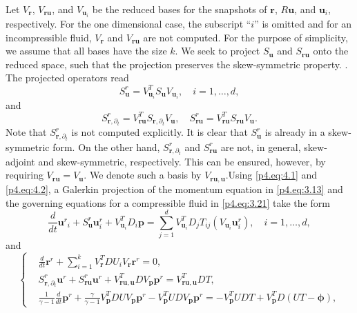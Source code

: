 Let $V_{\mathbf r}$, $V_{\mathbf r \mathbf u}$, and $V_{\mathbf u_i}$ be the reduced bases for the snapshots of $\mathbf r$, $R \mathbf u$, and $\mathbf u_i$, respectively. For the one dimensional case, the subscript ``$i$'' is omitted and for an incompressible fluid, $V_{ \mathbf r}$ and $V_{\mathbf r \mathbf u}$ are not computed. For the purpose of simplicity, we assume that all bases have the size $k$. We seek to project $S_{\mathbf u}$ and $S_{\mathbf r \mathbf u}$ onto the reduced space, such that the projection preserves the skew-symmetric property. . The projected operators read
\begin{equation} \label{p4.eq:4.1}
	S^r _{\mathbf u} = V_{ \mathbf u_i}^T S _{\mathbf u} V_{ \mathbf u_i}, \quad i=1,\dots,d,
\end{equation}
and
\begin{equation} \label{p4.eq:4.2}
	S^r_{\mathbf r ,\partial_t} =V_{\mathbf r \mathbf u}^T  S_{\mathbf r ,\partial_t} V_{\mathbf u}, \quad S^r _{\mathbf r \mathbf u} = V_{\mathbf r \mathbf u}^T  S _{\mathbf r \mathbf u} V_{\mathbf u}.
\end{equation}
Note that $S^r_{\mathbf r ,\partial_t}$ is not computed explicitly. It is clear that $S^r _{\mathbf u}$ is already in a skew-symmetric form. On the other hand, $S^r_{\mathbf r ,\partial_t}$ and $S^r _{\mathbf r \mathbf u}$ are not, in general, skew-adjoint and skew-symmetric, respectively. This can be ensured, however, by requiring $V_{\mathbf r \mathbf u} = V_{\mathbf u}$. We denote such a basis by $V_{\mathbf r \mathbf u, \mathbf u}$.Using \eqref{p4.eq:4.1} and \eqref{p4.eq:4.2}, a Galerkin projection of the momentum equation in \eqref{p4.eq:3.13} and the governing equations for a compressible fluid in \eqref{p4.eq:3.21} take the form
\begin{equation} \label{p4.eq:4.3}
	\frac{d}{dt} {\mathbf u^r}_i + S^r_{\mathbf u} \mathbf u^r_i + V_{\mathbf u_i} ^T D_i \mathbf p = \sum_{j=1}^d V_{\mathbf u_i}^T D_j T_{ij}(V_{ \mathbf u_i} \mathbf u^r_i), \quad i=1,\dots,d,
\end{equation}
and
\begin{equation} \label{p4.eq:4.4}
\left\{
\begin{aligned}
	& \frac{d}{dt} \mathbf r^r + \sum_{i=1}^k V^T_{\mathbf r}DU_iV_{\mathbf r}\mathbf r^r = 0, \\
	& S^r_{\mathbf r ,\partial_t} \mathbf u^r+ S^r _{\mathbf r \mathbf u} \mathbf u^r + V_{\mathbf r \mathbf u, \mathbf u}^T D V_{\mathbf p} \mathbf p^r = V_{\mathbf r \mathbf u, \mathbf u}^T D T, \\
	&\frac{1}{\gamma -1} \frac{d}{dt} \mathbf p^r + \frac{\gamma}{\gamma -1} V_{\mathbf p}^T D U V_{\mathbf p} \mathbf p^r - V_{\mathbf p}^T UD V_{\mathbf p} \mathbf p^r = - V_{\mathbf p}^T UDT + V_{\mathbf p}^T D(UT - \mathbf \phi),
\end{aligned}
\right.
\end{equation}
